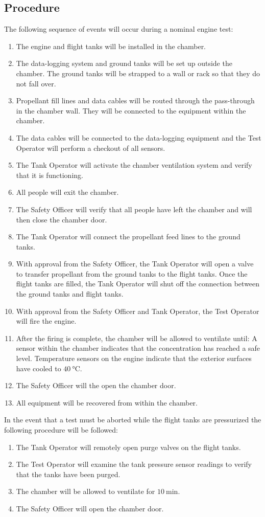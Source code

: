 \documentclass{article}
\begin{document}
\subsection{Procedure}
The following sequence of events will occur during a nominal engine test:
\begin{enumerate}
\item The engine and flight tanks will be installed in the chamber.
\item The data-logging system and ground tanks will be set up outside the chamber. The ground tanks will be strapped to a wall or rack so that they do not fall over.
\item Propellant fill lines and data cables will be routed through the pass-through in the chamber wall. They will be connected to the equipment within the chamber.
\item The data cables will be connected to the data-logging equipment and the Test Operator will perform a checkout of all sensors.
\item The Tank Operator will activate the chamber ventilation system and verify that it is functioning.
\item All people will exit the chamber.
\item The Safety Officer will verify that all people have left the chamber and will then close the chamber door.
\item The Tank Operator will connect the propellant feed lines to the ground tanks.
\item With approval from the Safety Officer, the Tank Operator will open a valve to transfer propellant from the ground tanks to the flight tanks. Once the flight tanks are filled, the Tank Operator will shut off the connection between the ground tanks and flight tanks.
\item With approval from the Safety Officer and Tank Operator, the Test Operator will fire the engine.
\item After the firing is complete, the chamber will be allowed to ventilate until:
\subitem A  sensor within the chamber indicates that the  concentration has reached a safe level.
\subitem Temperature sensors on the engine indicate that the exterior surfaces have cooled to $\SI{40}{\celsius}$. 
\item The Safety Officer will the open the chamber door.
\item All equipment will be recovered from within the chamber.
\end{enumerate}
In the event that a test must be aborted while the flight tanks are pressurized the following procedure will be followed:
\begin{enumerate}
\item The Tank Operator will remotely open purge valves on the flight tanks.
\item The Test Operator will examine the tank pressure sensor readings to verify that the tanks have been purged.
\item The chamber will be allowed to ventilate for $\SI{10}{\minute}$.
\item The Safety Officer will open the chamber door.
\end{enumerate}
\end{document}
